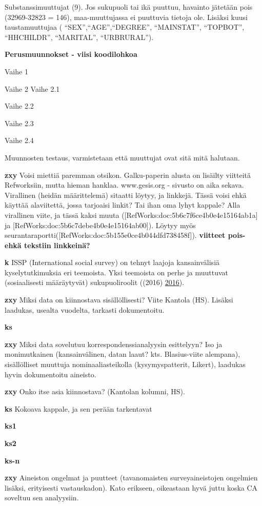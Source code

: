\documentclass[
  finnish,
]{book}
\begin{document}
Substanssimuuttujat (9). Jos sukupuoli tai ikä puuttuu, havainto
jätetään pois (32969-32823 = 146), maa-muuttujassa ei puuttuvia tietoja
ole. Lisäksi kuusi taustamuuttujaa ( ``SEX'',``AGE'',``DEGREE'',
``MAINSTAT'', ``TOPBOT'', ``HHCHILDR'', ``MARITAL'', ``URBRURAL'').

\textbf{Perusmuunnokset - viisi koodilohkoa}

Vaihe 1

Vaihe 2 Vaihe 2.1

Vaihe 2.2

Vaihe 2.3

Vaihe 2.4

Muunnosten testaus, varmistetaan että muuttujat ovat sitä mitä halutaan.

\textbf{zxy} Voisi miettiä paremman otsikon. Galku-paperin alusta on
lisäilty viitteitä Refworksiin, mutta hieman hanklaa. www.gesis.org -
sivusto on aika sekava. Virallinen (heidän määrittelemä) sitaatti
löytyy, ja linkkejä. Tässä voisi ehkä käyttää alaviitettä, jossa
tarjoaisi linkit? Tai ihan oma lyhyt kappale? Alla virallinen viite, ja
tässä kaksi muuta ({[}RefWorks:doc:5b6c7f6ce4b0e4e15164ab1a{]} ja
{[}RefWorks:doc:5b6c7debe4b0e4e15164ab00{]}). Löytyy myös
seurantaraportti({[}RefWorks:doc:5b155e0ce4b044dfd738458f{]}).
\textbf{viitteet pois- ehkä tekstiin linkkeinä?}

\textbf{k} ISSP (International social survey) on tehnyt laajoja
kansainvälisiä kyselytutkimuksia eri teemoista. Yksi teemoista on perhe
ja muuttuvat (sosiaalisesti määräytyvät) sukupuoliroolit ((2016)
\protect\hyperlink{ref-RefWorks:doc:5b6c7b0de4b0fd36f5bb4c2a}{2016}).

\textbf{zxy} Miksi data on kiinnostava sisällöllisesti? Viite Kantola
(HS). Lisäksi laadukas, usealta vuodelta, tarkasti dokumentoitu.

\textbf{ks}

\textbf{zxy} Miksi data sovelutuu korrespondenssianalyysin esittelyyn?
Iso ja monimutkainen (kansainvälinen, datan laaut? kts. Blasius-viite
alempana), sisällölliset muuttuja nominaaliasteikolla (kysymyspatterit,
Likert), laadukas hyvin dokumentoitu aineisto.

\textbf{zxy} Onko itse asia kiinnostava? (Kantolan kolumni, HS).

\textbf{ks} Kokoava kappale, ja sen perään tarkentavat

\textbf{ks1}

\textbf{ks2}

\textbf{ks-n}

\textbf{zxy} Aineiston ongelmat ja puutteet (tavanomaisten
surveyaineistojen ongelmien lisäksi, erityisesti vastauskadon). Kato
erikseen, oikeastaan hyvä juttu koska CA soveltuu sen analyysiin.
\end{document}
